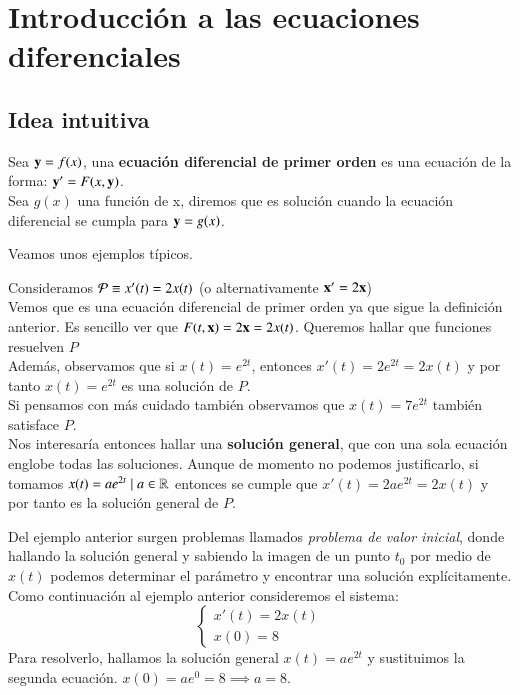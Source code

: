 
\chapter{Introducci\'{o}n a las ecuaciones diferenciales}

\section{Idea intuitiva}
\begin{dfn}
	Sea $\mbf{y} = f(x)$, una \textbf{ecuación diferencial de primer orden} es una ecuación de la forma: $\mbf{y'}=F(x,\mathbf{y})$.\\
    Sea $g(x)$ una función de x, diremos que es solución cuando la ecuación diferencial se cumpla para $\mbf{y} = g(x)$.
\end{dfn}

Veamos unos ejemplos típicos.

\begin{eg}
    Consideramos $\P \equiv x'(t) = 2x(t)$ (o alternativamente $\mbf{x}' = 2\mbf{x}$)\\
    Vemos que es una ecuación diferencial de primer orden ya que sigue la definición anterior. Es sencillo ver que $F(t,\mbf{x}) = 2\mbf{x} = 2x(t)$. Queremos hallar que funciones resuelven $P$\\
    Además, observamos que si $x(t) = e^{2t}$, entonces $x'(t) = 2e^{2t} = 2x(t)$ y por tanto $x(t) = e^{2t}$ es una solución de $P$.\\Si pensamos con más cuidado también observamos que $x(t) = 7e^{2t}$ también satisface $P$.\\
    Nos interesaría entonces hallar una \textbf{solución general}, que con una sola ecuación englobe todas las soluciones. Aunque de momento no podemos justificarlo, si tomamos $x(t) = ae^{2t} \mid a \in \R$ entonces se cumple que $x'(t) = 2ae^{2t} = 2x(t)$ y por tanto es la solución general de $P$.
\end{eg}

Del ejemplo anterior surgen problemas llamados \textit{problema de valor inicial}, donde hallando la solución general y sabiendo la imagen de un punto $t_0$ por medio de $x(t)$ podemos determinar el parámetro y encontrar una solución explícitamente. Como continuación al ejemplo anterior consideremos el sistema:
$$
    \begin{cases}
        x'(t) = 2x(t) \\ x(0) = 8
    \end{cases}
$$
Para resolverlo, hallamos la solución general $x(t) = ae^{2t}$ y sustituimos la segunda ecuación. $x(0) = ae^{0} = 8 \implies a = 8$.

